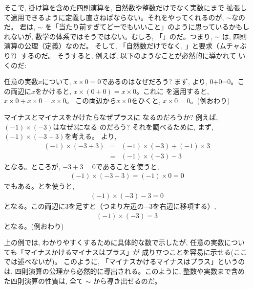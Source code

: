 そこで, 掛け算を含めた四則演算を, 自然数や整数だけでなく実数にまで
拡張して適用できるように定義し直さねばならない。それをやってくれるのが, 
$\sim$なのだ。
君は, $\sim$
を「当たり前すぎてどーでもいいこと」のように思っているかもしれないが, 
数学の体系ではそうではない。むしろ, 
「」のだ。つまり, $\sim$
は, 四則演算の公理（定義）なのだ。
そして, 「自然数だけでなく, 」と要求（ムチャぶり?）するのだ。
そうすると, 例えば, 以下のようなことが必然的に導かれて
いくのだ:

\begin{exmpl}\label{exmpl:times0} 任意の実数$x$について, 
$x\times0=0$であるのはなぜだろう? 
まず, より, 0+0=0。この両辺に$x$をかけると, 
$x\times (0+0)=x\times0$。これに
を適用すると, $x\times 0+x\times 0=x\times0$。
この両辺から$x\times 0$をひくと, $x\times 0=0$。(例おわり)
\end{exmpl}

\begin{exmpl} マイナスとマイナスをかけたらなぜプラスに
なるのだろうか? 例えば, $(-1)\times(-3)$はなぜ3になる
のだろう? それを調べるために, まず, $(-1)\times(-3+3)$を考える。
より, 
\begin{eqnarray}
(-1)\times(-3+3)&=&(-1)\times(-3)+(-1)\times 3\nonumber\\
&=&(-1)\times(-3)-3\label{eq:minminplus0}
\end{eqnarray}
となる。ところが, $-3+3=0$であることを使うと,
\begin{eqnarray}
(-1)\times(-3+3)=(-1)\times0=0\label{eq:minminplus1}
\end{eqnarray}
でもある。とを使うと, 
\begin{eqnarray}
(-1)\times (-3)-3=0
\end{eqnarray}
となる。この両辺に3を足すと（つまり左辺の$-3$を右辺に移項する）, 
\begin{eqnarray}
(-1)\times (-3)=3
\end{eqnarray}
となる。(例おわり)
\end{exmpl}

上の例では, わかりやすくするために具体的な数で示したが, 
任意の実数についても「マイナスかけるマイナスはプラス」が
成り立つことを容易に示せる(ここでは述べないが)。
このように, 「マイナスかけるマイナスはプラス」というのは, 
四則演算の公理から必然的に導出される。このように, 
整数や実数まで含めた四則演算の性質は, 全て
$\sim$
から導き出せるのだ。

